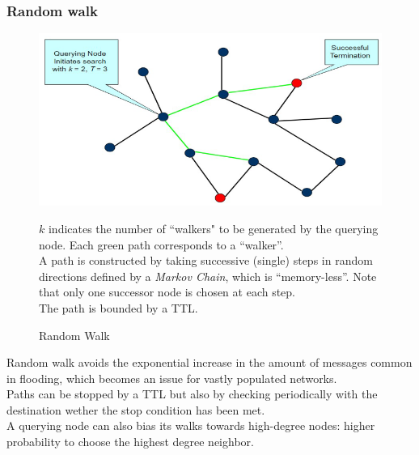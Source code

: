 \subsubsection{Random walk}

\begin{figure}[htbp]
   \centering
   \includegraphics{images/randomwalk.png}
   \caption{Random Walk}
   \label{fig:randomwalk}
   $k$ indicates the number of ``walkers" to be generated by the querying node. Each green path corresponds to a ``walker''.\\
   A path is constructed by taking successive (single) steps in random directions defined by a \textit{Markov Chain}, which is ``memory-less''.
   Note that only one successor node is chosen at each step.\\
   The path is bounded by a TTL.
\end{figure}
Random walk avoids the exponential increase in the amount of messages common in flooding, which becomes an issue for vastly populated networks.\\
Paths can be stopped by a TTL but also by checking periodically with the destination wether the stop condition has been met.\\
A querying node can also bias its walks towards high-degree nodes: higher probability to choose the highest degree neighbor.

\newpage
